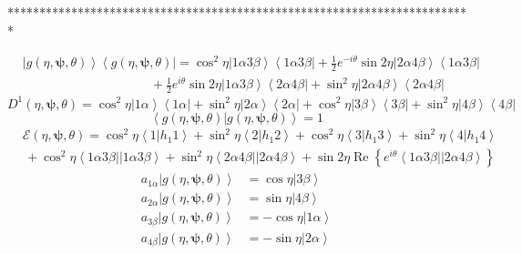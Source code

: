 \documentclass[aps,preprint]{revtex4}%
\begin{document}
*************************************************************************%

\begin{align*}
&  \left\vert g\left(  \eta,\mathbf{\psi,}\theta\right)  \right\rangle
\left\langle g\left(  \eta,\mathbf{\psi,}\theta\right)  \right\vert =\cos
^{2}\eta\left\vert 1\alpha3\beta\right\rangle \left\langle 1\alpha
3\beta\right\vert +\frac{1}{2}e^{-i\theta}\sin2\eta\left\vert 2\alpha
4\beta\right\rangle \left\langle 1\alpha3\beta\right\vert \\
&  \qquad\qquad\qquad\qquad\qquad+\frac{1}{2}e^{i\theta}\sin2\eta\left\vert
1\alpha3\beta\right\rangle \left\langle 2\alpha4\beta\right\vert +\sin^{2}%
\eta\left\vert 2\alpha4\beta\right\rangle \left\langle 2\alpha4\beta
\right\vert
\end{align*}%
\[
D^{1}\left(  \eta,\mathbf{\psi,}\theta\right)  =\cos^{2}\eta\left\vert
1\alpha\right\rangle \left\langle 1\alpha\right\vert +\sin^{2}\eta\left\vert
2\alpha\right\rangle \left\langle 2\alpha\right\vert +\cos^{2}\eta\left\vert
3\beta\right\rangle \left\langle 3\beta\right\vert +\sin^{2}\eta\left\vert
4\beta\right\rangle \left\langle 4\beta\right\vert
\]%
\[
\left\langle \left.  g\left(  \eta,\mathbf{\psi,}\theta\right)  \right\vert
g\left(  \eta,\mathbf{\psi,}\theta\right)  \right\rangle =1
\]%
\begin{align*}
&  \mathcal{E}\left(  \eta,\mathbf{\psi,}\theta\right)  =\cos^{2}%
\eta\left\langle 1\left\vert h_{1}1\right.  \right\rangle +\sin^{2}%
\eta\left\langle 2\left\vert h_{1}2\right.  \right\rangle +\cos^{2}%
\eta\left\langle 3\left\vert h_{1}3\right.  \right\rangle +\sin^{2}%
\eta\left\langle 4\left\vert h_{1}4\right.  \right\rangle \\
&  \,+\cos^{2}\eta\left\langle 1\alpha3\beta\right\vert \left\vert
1\alpha3\beta\right\rangle +\sin^{2}\eta\left\langle 2\alpha4\beta\right\vert
\left\vert 2\alpha4\beta\right\rangle +\sin2\eta\operatorname{Re}\left\{
e^{i\theta}\left\langle 1\alpha3\beta\right\vert \left\vert 2\alpha
4\beta\right\rangle \right\}
\end{align*}%
\begin{align*}
a_{1\alpha}\left\vert g\left(  \eta,\mathbf{\psi,}\theta\right)
\right\rangle  &  =\cos\eta\left\vert 3\beta\right\rangle \\
a_{2\alpha}\left\vert g\left(  \eta,\mathbf{\psi,}\theta\right)
\right\rangle  &  =\sin\eta\left\vert 4\beta\right\rangle \\
a_{3\beta}\left\vert g\left(  \eta,\mathbf{\psi,}\theta\right)  \right\rangle
&  =-\cos\eta\left\vert 1\alpha\right\rangle \\
a_{4\beta}\left\vert g\left(  \eta,\mathbf{\psi,}\theta\right)  \right\rangle
&  =-\sin\eta\left\vert 2\alpha\right\rangle
\end{align*}%
\end{document}
